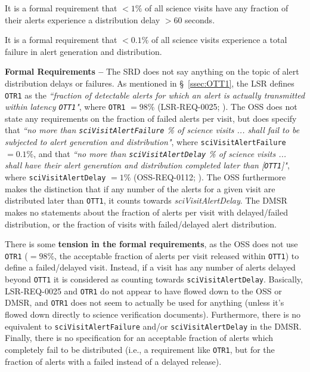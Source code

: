 \documentclass[DM,authoryear,toc]{lsstdoc}
\begin{document}
It is a formal requirement that $<1\%$ of all science visits have any fraction of their alerts experience a distribution delay $>60$ seconds.

It is a formal requirement that $<0.1\%$ of all science visits experience a total failure in alert generation and distribution.

{\bf Formal Requirements --} The SRD does not say anything on the topic of alert distribution delays or failures. As mentioned in \S~\ref{ssec:OTT1}, the LSR defines {\tt OTR1} as the {\it ``fraction of detectable alerts for which an alert is actually transmitted within latency {\tt OTT1}"}, where {\tt OTR1} $=98\%$ (LSR-REQ-0025; ). The OSS does not state any requirements on the fraction of failed alerts per visit, but does specify that {\it ``no more than {\tt sciVisitAlertFailure} \% of science visits ... shall fail to be subjected to alert generation and distribution"}, where {\tt sciVisitAlertFailure} $=0.1\%$, and that {\it ``no more than {\tt sciVisitAlertDelay} \% of science visits ... shall have their alert generation and distribution completed later than [{\tt OTT1}]"}, where {\tt sciVisitAlertDelay} $=1\%$ (OSS-REQ-0112; ). The OSS furthermore makes the distinction that if any number of the alerts for a given visit are distributed later than {\tt OTT1}, it counts towards {\it sciVisitAlertDelay}. The DMSR makes no statements about the fraction of alerts per visit with delayed/failed distribution, or the fraction of visits with failed/delayed alert distribution.

There is some {\bf tension in the formal requirements}, as the OSS does not use {\tt OTR1} ($=98\%$, the acceptable fraction of alerts per visit released within {\tt OTT1}) to define a failed/delayed visit. Instead, if a visit has any number of alerts delayed beyond {\tt OTT1} it is considered as counting towards {\tt sciVisitAlertDelay}. Basically, LSR-REQ-0025 and {\tt OTR1} do not appear to have flowed down to the OSS or DMSR, and {\tt OTR1} does not seem to actually be used for anything (unless it's flowed down directly to science verification documents). Furthermore, there is no equivalent to {\tt sciVisitAlertFailure} and/or {\tt sciVisitAlertDelay} in the DMSR. Finally, there is no specification for an acceptable fraction of alerts which completely fail to be distributed (i.e., a requirement like {\tt OTR1}, but for the fraction of alerts with a failed instead of a delayed release).
\end{document}
